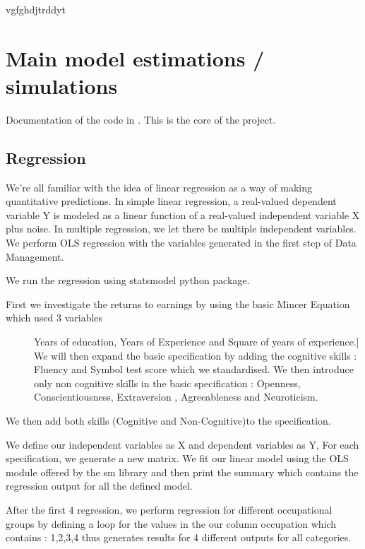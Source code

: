 \documentclass[a4paper,11pt,english]{sphinxmanual}
\begin{document}
vgfghdjtrddyt


\chapter{Main model estimations / simulations}
\label{\detokenize{analysis:main-model-estimations-simulations}}\label{\detokenize{analysis:analysis}}\label{\detokenize{analysis::doc}}
Documentation of the code in . This is the core of the project.


\section{Regression}
\label{\detokenize{analysis:module-src.analysis.reg_tree}}\label{\detokenize{analysis:regression}}
We’re all familiar with the idea of linear regression as a way of making quantitative predictions. In simple linear regression, a real-valued dependent variable Y is modeled as a linear function of a real-valued independent variable X plus noise.
In multiple regression, we let there be multiple independent variables. We perform OLS regression with the variables generated in the first step of Data Management.

We run the regression using statsmodel python package.
\begin{description}
\item[{First we investigate the returns to earnings by  using the basic Mincer Equation which used 3 variables}] \leavevmode{[}Years of education, Years of Experience and Square of years of experience.{]}
We will then expand the basic specification by adding the cognitive skills : Fluency and Symbol test score which we standardised.
We then introduce only non cognitive skills in the basic specification : Openness, Conscientiousness, Extraversion , Agreeableness and Neuroticism.

\end{description}

We then add both skills (Cognitive and Non-Cognitive)to the specification.

We define our independent variables as X and dependent variables as Y, For each specification, we generate a new matrix. We fit our linear model using the OLS module offered by the sm library and then print the summary which contains the regression output for all the defined model.

After the first 4 regression, we perform regression for different occupational groups by defining a loop for the values in the our column occupation which contains : 1,2,3,4 thus generates results for 4 different outputs for all categories.
\end{document}
